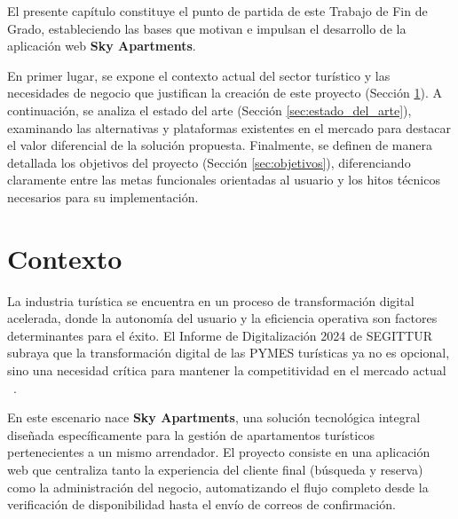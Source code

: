 El presente capítulo constituye el punto de partida de este Trabajo de Fin de Grado, estableciendo las bases que motivan e impulsan el desarrollo de la aplicación web \textbf{Sky Apartments}.

En primer lugar, se expone el contexto actual del sector turístico y las necesidades de negocio que justifican la creación de este proyecto (Sección \ref{sec:contexto}). A continuación, se analiza el estado del arte (Sección \ref{sec:estado_del_arte}), examinando las alternativas y plataformas existentes en el mercado para destacar el valor diferencial de la solución propuesta. Finalmente, se definen de manera detallada los objetivos del proyecto (Sección \ref{sec:objetivos}), diferenciando claramente entre las metas funcionales orientadas al usuario y los hitos técnicos necesarios para su implementación.
\section{Contexto}
\label{sec:contexto}

La industria turística se encuentra en un proceso de transformación digital acelerada, donde la autonomía del usuario y la eficiencia operativa son factores determinantes para el éxito. El Informe de Digitalización 2024 de SEGITTUR subraya que la transformación digital de las PYMES turísticas ya no es opcional, sino una necesidad crítica para mantener la competitividad en el mercado actual ~\cite{Segittur2024}.

En este escenario nace \textbf{Sky Apartments}, una solución tecnológica integral diseñada específicamente para la gestión de apartamentos turísticos pertenecientes a un mismo arrendador. El proyecto consiste en una aplicación web que centraliza tanto la experiencia del cliente final (búsqueda y reserva) como la administración del negocio, automatizando el flujo completo desde la verificación de disponibilidad hasta el envío de correos de confirmación.


